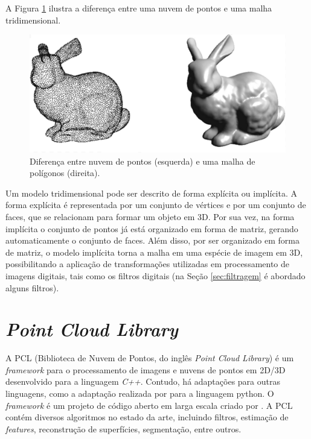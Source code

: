 A Figura \ref{fig:bunny_example} ilustra a diferença entre uma nuvem de pontos e uma malha tridimensional.

\begin{figure}[H]
    \centering
    \includegraphics[scale=0.3]{dados/figuras/bunny_example.png}
    \caption{Diferença entre nuvem de pontos (esquerda) e uma malha de polígonos (direita).}
    \label{fig:bunny_example}
\end{figure}

Um modelo tridimensional pode ser descrito de forma explícita ou implícita.
A forma explícita é representada por um conjunto de vértices e por um conjunto de faces, que se relacionam para formar um objeto em 3D.
Por sua vez, na forma implícita o conjunto de pontos já está organizado em forma de matriz, gerando automaticamente o conjunto de faces. 
Além disso, por ser organizado em forma de matriz, o modelo implícita torna a malha em uma espécie de imagem em 3D, possibilitando a aplicação de transformações utilizadas em processamento de imagens digitais, tais como os filtros digitais (na Seção \ref{sec:filtragem} é abordado alguns filtros). 
\fi

\section{\textit{Point Cloud Library}}
\label{sec:pcl}

A PCL (Biblioteca de Nuvem de Pontos, do inglês \textit{Point Cloud Library}) é um \textit{framework} para o processamento de imagens e nuvens de pontos em 2D/3D desenvolvido para a linguagem \textit{C++}. Contudo, há adaptações para outras linguagens, como a adaptação realizada por \cite{strawlab2012} para a linguagem python. 
O \textit{framework} é um projeto de código aberto em larga escala criado por \cite{rusu2011pcl}. 
A PCL contém diversos algoritmos no estado da arte, incluindo filtros, estimação de \textit{features}, reconstrução de superfícies, segmentação, entre outros. 

